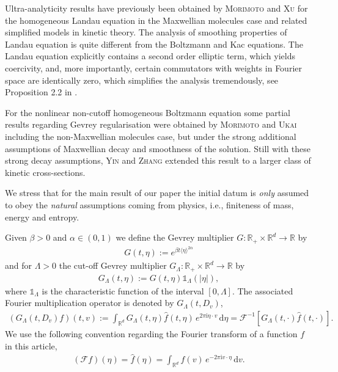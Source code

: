 \documentclass[11pt,a4paper,reqno]{amsart}
\theoremstyle{plain}
\theoremstyle{definition}
\begin{document}
Ultra-analyticity results have previously been obtained by \textsc{Morimoto} and \textsc{Xu} \cite{MX09} for the homogeneous Landau equation in the Maxwellian molecules case and related simplified models in kinetic theory.
The analysis of smoothing properties of Landau equation is quite different from the Boltzmann and Kac equations. The Landau equation explicitly contains a second order elliptic term, which yields coercivity,  and, more importantly, certain commutators with weights in Fourier space are identically zero, which simplifies the analysis tremendously, see Proposition 2.2 in \cite{MX09}.

For the nonlinear non-cutoff homogeneous Boltzmann equation some partial results regarding Gevrey regularisation were obtained by \textsc{Morimoto} and \textsc{Ukai} \cite{MU10} including the non-Maxwellian molecules case, but under the strong additional assumptions of Maxwellian decay and smoothness of the solution. Still with these strong decay assumptions, \textsc{Yin} and \textsc{Zhang} \cite{YZ12,YZ14} extended this result to a larger class of kinetic cross-sections.

We stress that for the main result of our paper the initial datum is \emph{only} assumed to obey the \emph{natural} assumptions coming from physics, i.e., finiteness of mass, energy and entropy.

\bigskip

Given $\beta>0$ and $\alpha\in(0,1)$ we define the Gevrey multiplier $G: {\mathbb{R}}_+ \times {\mathbb{R}}^d \to {\mathbb{R}}$ by
\begin{align*}
G(t, \eta) := e^{\beta t \langle \eta\rangle^{2\alpha}}
\end{align*}
and for $\Lambda>0$ the cut-off Gevrey multiplier $G_{\Lambda}: {\mathbb{R}}_+ \times {\mathbb{R}}^d \to {\mathbb{R}}$ by
\begin{align*}
G_{\Lambda}(t,\eta):= G(t, \eta) {\mathds{1}}_{\Lambda}(|\eta|),
\end{align*}
where ${\mathds{1}}_{\Lambda}$ is the characteristic function of the interval $[0, \Lambda]$. The associated Fourier multiplication operator is denoted by $G_{\Lambda}(t,D_v)$,
\begin{align*}
	(G_{\Lambda}(t, D_v)f)(t,v) := \int_{{\mathbb{R}}^d} G_{\Lambda}(t,\eta)\hat{f}(t, \eta) \, e^{2\pi{\mathrm{i}} \eta\cdot v} \,\mathrm{d}\eta = \mathcal{F}^{-1}\left[ G_{\Lambda}(t,\cdot) \hat{f}(t, \cdot) \right].
\end{align*}
We use the following convention regarding the Fourier transform of a function $f$ in this article,
\begin{align*}
	(\mathcal{F} f) (\eta) = \hat{f}(\eta) = \int_{{\mathbb{R}}^d} f(v) \, e^{-2\pi{\mathrm{i}} v\cdot \eta} \,\mathrm{d}v.
\end{align*}
\end{document}
